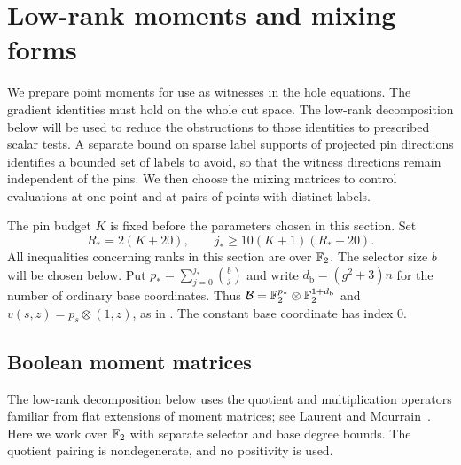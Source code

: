 \section{Low-rank moments and mixing forms}\label{sec:moments}

We prepare point moments for use as witnesses in the hole equations.
The gradient identities must hold on the whole cut space.  The
low-rank decomposition below will be used to reduce the obstructions
to those identities to prescribed scalar tests.  A separate bound
on sparse label supports of projected pin directions identifies a
bounded set of labels to avoid, so that the witness directions remain
independent of the pins.  We then choose the mixing matrices to control evaluations
at one point and at pairs of points with distinct labels.

The pin budget $K$ is fixed before the parameters chosen in this
section.  Set
\begin{equation}\label{eq:moment-parameters}
 R_*=2(K+20),\qquad
 j_*\ge 10(K+1)(R_*+20).
\end{equation}
All inequalities concerning ranks in this section are over $\mathbb F_2$.
The selector size $b$ will be chosen below.  Put
$p_*=\sum_{j=0}^{j_*}\binom bj$ and write $d_{\mathrm b}=(g^2+3)n$ for the
number of ordinary base coordinates.  Thus
$\mathcal B=\mathbb F_2^{p_*}\otimes\mathbb F_2^{1+d_{\mathrm b}}$ and
$v(s,z)=p_s\otimes(1,z)$, as in .
The constant base coordinate has index $0$.

\subsection{Boolean moment matrices}

The low-rank decomposition below uses the quotient and multiplication
operators familiar from flat extensions of moment matrices; see
Laurent and Mourrain~\citep[Section~2, especially Lemma~2.1]{laurentmourrain2009}.
Here we work over $\mathbb F_2$ with separate selector and base degree bounds.
The quotient pairing is nondegenerate, and no positivity is used.

